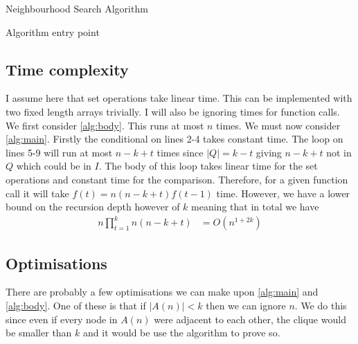 \documentclass[11pt]{article}
\begin{document}
\begin{algorithm}
\caption{Neighbourhood Search Algorithm}\label{alg:main}
\end{algorithm}

\begin{algorithm}
\caption{Algorithm entry point}\label{alg:body}
\end{algorithm}

\subsection{Time complexity}

I assume here that set operations take linear time. This can be implemented with two fixed length arrays trivially. I will also be ignoring times for function calls.\\

We first consider \cref{alg:body}. This runs at most $n$ times. We must now consider \cref{alg:main}. Firstly the conditional on lines 2-4 takes constant time. The loop on lines 5-9 will run at most $n-k+t$ times since $|Q|=k-t$ giving $n-k+t$ not in $Q$ which could be in $I$. The body of this loop takes linear time for the set operations and constant time for the comparison. Therefore, for a given function call it will take $f(t)=n(n-k+t)f(t-1)$ time. However, we have a lower bound on the recursion depth however of $k$ meaning that in total we have
\begin{equation}
	\begin{aligned}
		n\prod_{t=1}^kn(n-k+t)&=O(n^{1+2k})
	\end{aligned}
\end{equation}

\subsection{Optimisations}
\label{subsec:optimisations}

There are probably a few optimisations we can make upon \cref{alg:main} and \cref{alg:body}. One of these is that if $|A(n)|<k$ then we can ignore $n$. We do this since even if every node in $A(n)$ were adjacent to each other, the clique would be smaller than $k$ and it would be use the algorithm to prove so.
\end{document}
